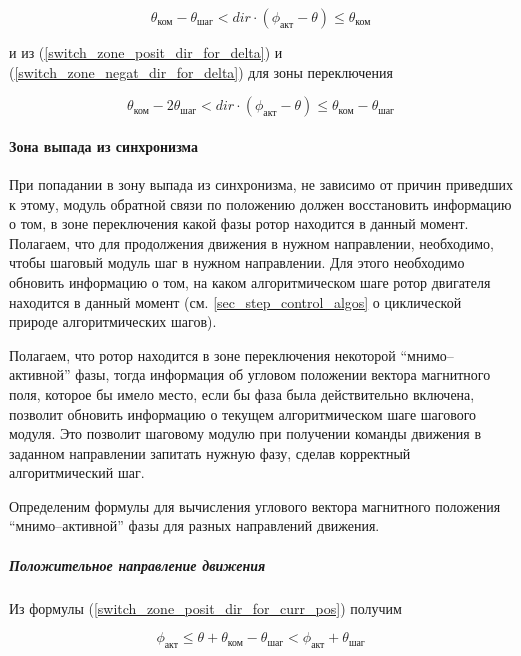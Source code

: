 \begin{equation}
    \label{movement_zone_for_delta}
    \theta_\textit{ком} - \theta_\textit{шаг}
    < dir \cdot (\phi_\textit{акт} - \theta)
    \leq \theta_\textit{ком}
\end{equation}

и из (\ref{switch_zone_posit_dir_for_delta})
и (\ref{switch_zone_negat_dir_for_delta}) для зоны переключения

\begin{equation}
    \label{switch_zone_for_delta}
    \theta_\textit{ком} - 2\theta_\textit{шаг}
    < dir \cdot (\phi_\textit{акт} - \theta)
    \leq \theta_\textit{ком} - \theta_\textit{шаг}
\end{equation}

\paragraph{Зона выпада из синхронизма}

При попадании в зону выпада из синхронизма, не зависимо от причин приведших к этому,
модуль обратной связи по положению должен восстановить информацию о том,
в зоне переключения какой фазы ротор находится в данный момент. Полагаем, что для
продолжения движения в нужном направлении, необходимо, чтобы шаговый модуль
шаг в нужном направлении. Для этого необходимо обновить информацию о том, на каком
алгоритмическом шаге ротор двигателя находится в данный момент
(см. \ref{sec_step_control_algos} о циклической природе алгоритмических шагов).

Полагаем, что ротор находится в зоне переключения некоторой ``мнимо--активной'' фазы,
тогда информация об угловом положении вектора магнитного поля, которое бы имело место,
если бы фаза была действительно включена, позволит обновить информацию о текущем
алгоритмическом шаге шагового модуля. Это позволит шаговому модулю при получении
команды движения в заданном направлении запитать нужную фазу, сделав корректный
алгоритмический шаг.

Определеним формулы для вычисления углового вектора магнитного положения
``мнимо--активной'' фазы для разных направлений движения.

\subparagraph{Положительное направление движения}

Из формулы (\ref{switch_zone_posit_dir_for_curr_pos}) получим

\begin{equation}
    \label{sync_restore_posit_dir_active_pole_pos_conditions}
    \phi_\textit{акт}
    \leq \theta + \theta_\textit{ком} - \theta_\textit{шаг}
    < \phi_\textit{акт} + \theta_\textit{шаг}
\end{equation}

